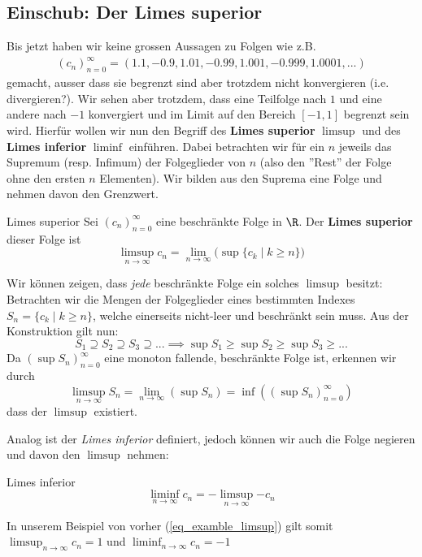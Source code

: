 \subsection{Einschub: Der Limes superior}
Bis jetzt haben wir keine grossen Aussagen zu Folgen wie z.B. 
\begin{align}\label{eq_examble_limsup}
    (c_n)_{n=0}^\infty = (1.1, -0.9, 1.01, -0.99, 1.001, -0.999, 1.0001, ...)
\end{align} gemacht, ausser dass sie begrenzt sind aber trotzdem nicht konvergieren (i.e. divergieren?). Wir sehen aber trotzdem, dass eine Teilfolge nach $1$ und eine andere nach $-1$ konvergiert und im Limit auf den Bereich $[-1, 1]$ begrenzt sein wird. Hierfür wollen wir nun den Begriff des \textbf{Limes superior} $\limsup$ und des \textbf{Limes inferior} $\liminf$ einführen. Dabei betrachten wir für ein $n$ jeweils das Supremum (resp. Infimum) der Folgeglieder von $n$ (also den ''Rest'' der Folge ohne den ersten $n$ Elementen). Wir bilden aus den Suprema eine Folge und nehmen davon den Grenzwert.

\begin{definition}{Limes superior}{}
Sei $(c_n)_{n=0}^\infty$ eine beschränkte Folge in $\R$. Der \textbf{Limes superior} dieser Folge ist
$$\limsup_{n \to \infty}{c_n} = \lim_{n \to \infty}{\big(\sup\{c_k\mid k\geq n\}\big)}$$
\end{definition}

Wir können zeigen, dass \textit{jede} beschränkte Folge ein solches $\limsup$ besitzt: Betrachten wir die Mengen der Folgeglieder eines bestimmten Indexes $S_n = \{c_k \mid k \geq n\}$, welche einerseits nicht-leer und beschränkt sein muss. Aus der Konstruktion gilt nun:
$$S_1 \supseteq S_2 \supseteq S_3 \supseteq ... \implies \sup S_1 \geq \sup S_2 \geq \sup S_3 \geq ...$$
Da $(\sup S_n)_{n=0}^\infty$ eine monoton fallende, beschränkte Folge ist, erkennen wir durch
$$\limsup_{n \to \infty}  S_n = \lim_{n \to \infty} (\sup S_n) = \inf((\sup S_n)_{n=0}^{\infty})$$
dass der $\limsup$ existiert.

Analog ist der \textit{Limes inferior} definiert, jedoch können wir auch die Folge negieren und davon den $\limsup$ nehmen:
\begin{definition}{Limes inferior}{}
$$\liminf_{n \to \infty}{c_n} = -\limsup_{n \to \infty}{-c_n}$$
\end{definition}

\begin{example}In unserem Beispiel von vorher (\ref{eq_examble_limsup}) gilt somit $\limsup_{n \to \infty} c_n = 1$ und $\liminf_{n \to \infty} c_n = -1$
\end{example}

